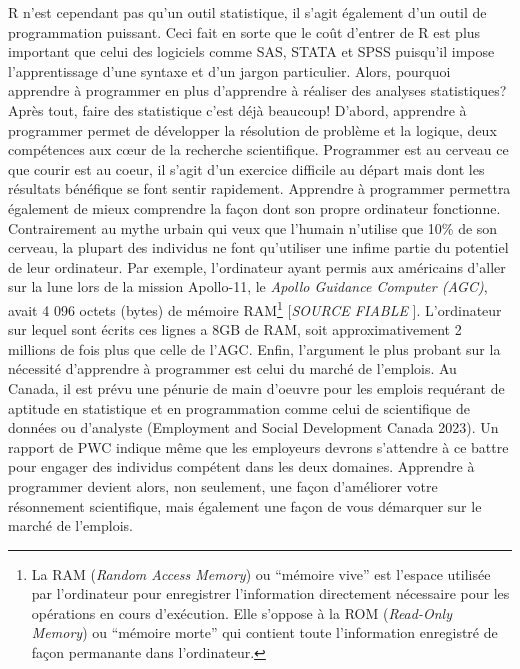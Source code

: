\documentclass[
  letterpaper,
]{scrbook}
\begin{document}
R n'est cependant pas qu'un outil statistique, il s'agit également d'un
outil de programmation puissant. Ceci fait en sorte que le coût d'entrer
de R est plus important que celui des logiciels comme SAS, STATA et SPSS
puisqu'il impose l'apprentissage d'une syntaxe et d'un jargon
particulier. Alors, pourquoi apprendre à programmer en plus d'apprendre
à réaliser des analyses statistiques? Après tout, faire des statistique
c'est déjà beaucoup! D'abord, apprendre à programmer permet de
développer la résolution de problème et la logique, deux compétences aux
cœur de la recherche scientifique. Programmer est au cerveau ce que
courir est au coeur, il s'agit d'un exercice difficile au départ mais
dont les résultats bénéfique se font sentir rapidement. Apprendre à
programmer permettra également de mieux comprendre la façon dont son
propre ordinateur fonctionne. Contrairement au mythe urbain qui veux que
l'humain n'utilise que 10\% de son cerveau, la plupart des individus ne
font qu'utiliser une infime partie du potentiel de leur ordinateur. Par
exemple, l'ordinateur ayant permis aux américains d'aller sur la lune
lors de la mission Apollo-11, le \emph{Apollo Guidance Computer (AGC)},
avait 4 096 octets (bytes) de mémoire RAM\footnote{La RAM (\emph{Random
  Access Memory}) ou ``mémoire vive'' est l'espace utilisée par
  l'ordinateur pour enregistrer l'information directement nécessaire
  pour les opérations en cours d'exécution. Elle s'oppose à la ROM
  (\emph{Read-Only Memory}) ou ``mémoire morte'' qui contient toute
  l'information enregistré de façon permanante dans l'ordinateur.}
{[}\emph{SOURCE FIABLE} {]}. L'ordinateur sur lequel sont écrits ces
lignes a 8GB de RAM, soit approximativement 2 millions de fois plus que
celle de l'AGC. Enfin, l'argument le plus probant sur la nécessité
d'apprendre à programmer est celui du marché de l'emplois. Au Canada, il
est prévu une pénurie de main d'oeuvre pour les emplois requérant de
aptitude en statistique et en programmation comme celui de scientifique
de données ou d'analyste (Employment and Social Development Canada
2023). Un rapport de PWC indique même que les employeurs devrons
s'attendre à ce battre pour engager des individus compétent dans les
deux domaines. Apprendre à programmer devient alors, non seulement, une
façon d'améliorer votre résonnement scientifique, mais également une
façon de vous démarquer sur le marché de l'emplois.
\end{document}
